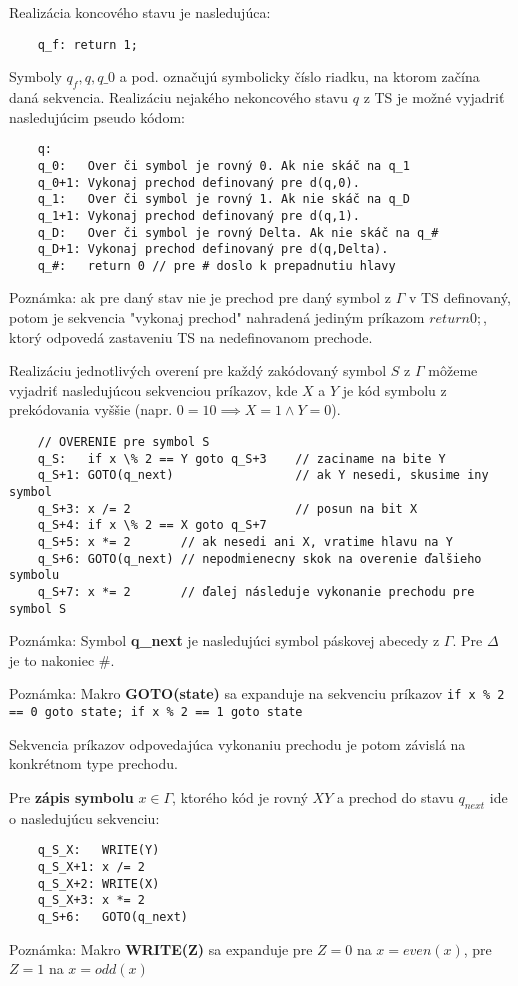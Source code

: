 \documentclass[10pt]{article}
\begin{document}
    Realizácia koncového stavu je nasledujúca:
    \begin{verbatim}
    q_f: return 1;
    \end{verbatim}

    Symboly $q_f, q, q\_0$ a pod. označujú symbolicky číslo riadku, na ktorom začína daná sekvencia. 
    Realizáciu nejakého nekoncového stavu $q$ z TS je možné vyjadriť nasledujúcim pseudo kódom:
    \begin{verbatim}
    q: 
    q_0:   Over či symbol je rovný 0. Ak nie skáč na q_1
    q_0+1: Vykonaj prechod definovaný pre d(q,0). 
    q_1:   Over či symbol je rovný 1. Ak nie skáč na q_D
    q_1+1: Vykonaj prechod definovaný pre d(q,1). 
    q_D:   Over či symbol je rovný Delta. Ak nie skáč na q_#
    q_D+1: Vykonaj prechod definovaný pre d(q,Delta). 
    q_#:   return 0 // pre # doslo k prepadnutiu hlavy
    \end{verbatim}

    Poznámka: ak pre daný stav nie je prechod pre daný symbol z $\Gamma$ v TS definovaný, potom je sekvencia
    "vykonaj prechod" nahradená jediným príkazom $return 0;$, ktorý odpovedá zastaveniu TS na
    nedefinovanom prechode.

    Realizáciu jednotlivých overení pre každý zakódovaný symbol $S$ z $\Gamma$ môžeme vyjadriť
    nasledujúcou sekvenciou príkazov, kde $X$ a $Y$ je kód symbolu z prekódovania vyššie (napr. $0 =
    10 \implies X = 1 \land Y = 0$).
    \begin{verbatim}
    // OVERENIE pre symbol S 
    q_S:   if x \% 2 == Y goto q_S+3    // zaciname na bite Y
    q_S+1: GOTO(q_next)                 // ak Y nesedi, skusime iny symbol 
    q_S+3: x /= 2                       // posun na bit X
    q_S+4: if x \% 2 == X goto q_S+7 
    q_S+5: x *= 2       // ak nesedi ani X, vratime hlavu na Y
    q_S+6: GOTO(q_next) // nepodmienecny skok na overenie ďalšieho symbolu
    q_S+7: x *= 2       // ďalej následuje vykonanie prechodu pre symbol S
    \end{verbatim}
    Poznámka: Symbol \textbf{q\_next} je nasledujúci symbol páskovej abecedy z $\Gamma$. Pre
    $\Delta$ je to nakoniec $\#$.

    Poznámka: Makro \textbf{GOTO(state)} sa expanduje na sekvenciu príkazov \texttt{if x \% 2 == 0 goto
    state; if x \% 2 == 1 goto state} 

    Sekvencia príkazov odpovedajúca vykonaniu prechodu je potom závislá na konkrétnom type prechodu.
    
    Pre \textbf{zápis symbolu} $x \in \Gamma$, ktorého kód je rovný $XY$ a prechod do stavu $q_{next}$ ide o
    nasledujúcu sekvenciu:
    \begin{verbatim}
    q_S_X:   WRITE(Y)
    q_S_X+1: x /= 2
    q_S_X+2: WRITE(X)
    q_S_X+3: x *= 2
    q_S+6:   GOTO(q_next)
    \end{verbatim}
    Poznámka: Makro \textbf{WRITE(Z)} sa expanduje pre $Z = 0$ na $x = even(x)$, pre $Z = 1$ na $x = odd(x)$ 
\end{document}
